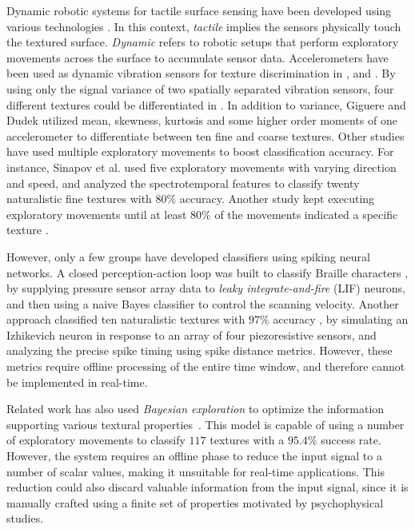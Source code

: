 Dynamic robotic systems for tactile surface sensing have been developed using various technologies \citep{dahiya2010tactile}. In this context, \textit{tactile} implies the sensors physically touch the textured surface. \textit{Dynamic} refers to robotic setups that perform exploratory movements across the surface to accumulate sensor data. %
Accelerometers have been used as dynamic vibration sensors for texture discrimination in %
\citep{howe1993dynamic}, \citep{giguere2011simple} %
and \citep{sinapov2011vibrotactile}. 
By using only the signal variance of two spatially separated vibration sensors, four different textures could be differentiated in \citep{tada2004sensing}. In addition to variance, Giguere and Dudek \citep{giguere2011simple} utilized mean, skewness, kurtosis and some higher order moments of one accelerometer to differentiate between ten fine and coarse textures. 
Other studies have used multiple exploratory movements to boost classification accuracy. For instance, Sinapov et al. \citep{sinapov2011vibrotactile} used five exploratory movements with varying direction and speed, and analyzed the spectrotemporal features to classify twenty naturalistic fine textures with $80\%$ accuracy. Another study kept executing exploratory movements until at least $80\%$ of the movements indicated a specific texture \citep{jamali2011majority}.



However, only a few groups have developed classifiers using spiking neural networks. A closed perception-action loop was built to classify Braille characters \citep{bologna2013closed}, by supplying pressure sensor array data to {\it leaky integrate-and-fire} (LIF) 
neurons, and then using a naive Bayes classifier to control the scanning velocity. 
Another approach classified ten naturalistic textures with $97\%$ accuracy \citep{rongala2015neuromorphic}, by simulating an Izhikevich neuron in response to an array of four piezoresistive sensors, and analyzing the precise spike timing using spike distance metrics. However, these metrics require offline processing of the entire time window, and therefore cannot be implemented in real-time.

Related work has also used {\it Bayesian exploration} to optimize the information supporting various textural \mbox{properties \citep{fishel2012bayesian}}. This model is capable of using a number of exploratory movements to classify $117$ textures with a $95.4\%$ success rate. However, the system requires an offline phase to reduce the input signal to a number of scalar values, making it unsuitable for real-time applications. This reduction could also discard valuable information from the input signal, since it is manually crafted using a finite set of properties motivated by psychophysical studies. 

